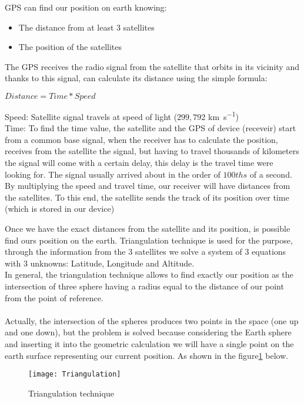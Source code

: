\documentclass{standalone}
\begin{document}
GPS can find our position on earth knowing:
\begin{itemize}
\item The distance from at least 3 satellites
\item The position of the satellites
\end{itemize}

The GPS receives the radio signal from the satellite that orbits in its vicinity and thanks to this signal, can calculate its distance using the simple formula:
\begin{center} $Distance = Time * Speed$ \end{center}

\noindent Speed: Satellite signal travels at speed of light ($299,792$ \si{\km\per\second})\\
Time: To find the time value, the satellite and the GPS of device (receveir) start from a common base signal, when the receiver has to calculate the position, receives from the satellite the signal, but having to travel thousands of kilometers the signal will come with a certain delay, this delay is the travel time were looking for. The signal usually arrived about in the order of $100ths$ of a second.
By multiplying the speed and travel time, our receiver will have distances from the satellites. To this end, the satellite sends the track of its position over time (which is stored in our device)

Once we have the exact distances from the satellite and its position, is possible find ours position on the earth. Triangulation technique is used for the purpose, through the information from the 3 satellites we solve a system of 3 equations with 3 unknowns: Latitude, Longitude and Altitude.\\
In general, the triangulation technique allows to find exactly our position as the intersection of three sphere having a radius equal to the distance of our point from the point of reference.\\\\
Actually, the intersection of the spheres produces two points in the space (one up and one down), but the problem is solved because considering the Earth sphere and inserting it into the geometric calculation we will have a single point on the earth surface representing our current position. As shown in the figure\ref{fig:Triangulation technique} below.
\vspace{1cm}
\begin{figure}[h]
\centering
\texttt{[image: Triangulation]}
\caption{Triangulation technique}
\label{fig:Triangulation technique}
\end{figure}
\vspace{0.5cm}
\end{document}
